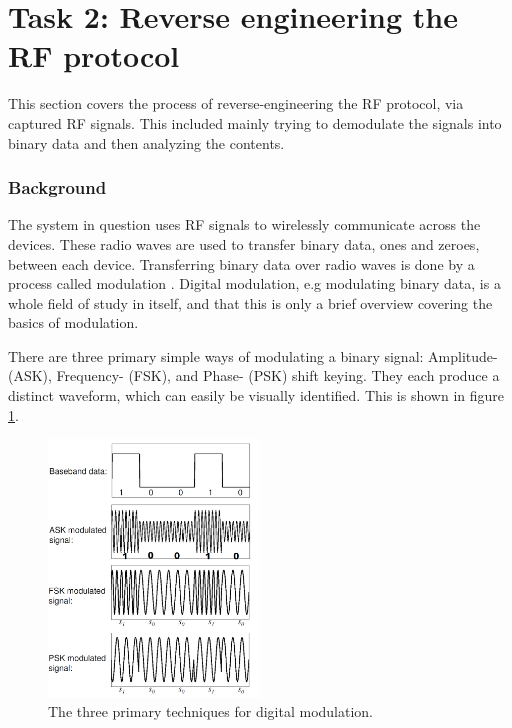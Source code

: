 \section{Task 2: Reverse engineering the RF protocol} \label{ch:pentesting:rf-reverse-engineering}
This section covers the process of reverse-engineering the RF protocol, via captured RF signals. This included mainly trying to demodulate the signals into binary data and then analyzing the contents.

\subsubsection{Background}
The system in question uses RF signals to wirelessly communicate across the devices. These radio waves are used to transfer binary data, ones and zeroes, between each device. Transferring binary data over radio waves is done by a process called modulation \cite{rf-modulation}. Digital modulation, e.g modulating binary data, is a whole field of study in itself, and that this is only a brief overview covering the basics of modulation.

There are three primary simple ways of modulating a binary signal: Amplitude- (ASK), Frequency- (FSK), and Phase- (PSK) shift keying. They each produce a distinct waveform, which can easily be visually identified. This is shown in figure \ref{fig:digital-modulation}.
\begin{figure}[!ht]
    \centering
    \includegraphics[width=0.5\textwidth]{images/6-pentesting/digital-modulation.png}
    \caption{The three primary techniques for digital modulation.}
    \label{fig:digital-modulation}
\end{figure}

